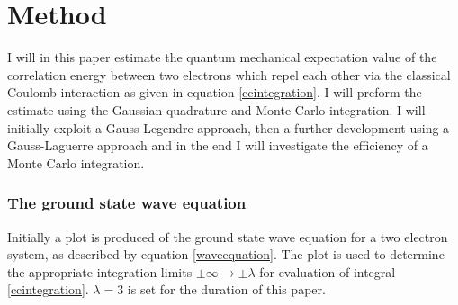 \documentclass[%
reprint,nofootinbib,
amsmath,amssymb,
aps,
]{revtex4-1}
\begin{document}
\section{Method}\noindent 
I will in this paper estimate the quantum mechanical expectation value of the correlation energy between two electrons which repel each other via the classical Coulomb interaction as given in equation \ref{ccintegration}. I will preform the estimate using the Gaussian quadrature and Monte Carlo integration. I will initially exploit a Gauss-Legendre approach, then a further development using a Gauss-Laguerre approach and in the end I will investigate the efficiency of a Monte Carlo integration. 
\subsubsection*{The ground state wave equation} \noindent 
Initially a plot is produced of the ground state wave equation for a two electron system, as described by equation \ref{waveequation}. The plot is used to determine the appropriate integration limits $\pm \infty \rightarrow \pm \lambda$ for evaluation of integral \ref{ccintegration}. $\lambda = 3$ is set for the duration of this paper.  
\end{document}

